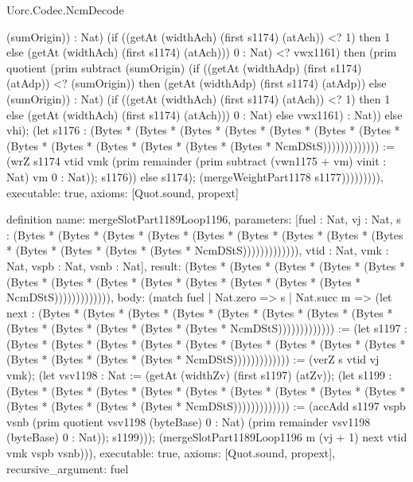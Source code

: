 \begin{lexlean}{Uorc.Codec.NcmDecode}
\begin{semanticmodule}
{(sumOrigin)) : Nat) (if ((getAt (widthAch) (first s1174) (atAch)) <? 1) then 1 else (getAt (widthAch) (first s1174) (atAch))) 0 : Nat) <? vwx1161) then (prim quotient (prim subtract (sumOrigin) (if ((getAt (widthAdp) (first s1174) (atAdp)) <? (sumOrigin)) then (getAt (widthAdp) (first s1174) (atAdp)) else (sumOrigin)) : Nat) (if ((getAt (widthAch) (first s1174) (atAch)) <? 1) then 1 else (getAt (widthAch) (first s1174) (atAch))) 0 : Nat) else vwx1161) : Nat)) else vhi); (let s1176 : (Bytes * (Bytes * (Bytes * (Bytes * (Bytes * (Bytes * (Bytes * (Bytes * (Bytes * (Bytes * (Bytes * (Bytes * (Bytes * NcmDStS))))))))))))) := (wrZ s1174 vtid vmk (prim remainder (prim subtract (vwn1175 + vm) vinit : Nat) vm 0 : Nat)); s1176)) else s1174); (mergeWeightPart1178 s1177))))))))),
  executable: true,
  axioms: [Quot.sound, propext]
}

definition{
  name: mergeSlotPart1189Loop1196,
  parameters: [fuel : Nat, vj : Nat, s : (Bytes * (Bytes * (Bytes * (Bytes * (Bytes * (Bytes * (Bytes * (Bytes * (Bytes * (Bytes * (Bytes * (Bytes * (Bytes * NcmDStS))))))))))))), vtid : Nat, vmk : Nat, vspb : Nat, vsnb : Nat],
  result: (Bytes * (Bytes * (Bytes * (Bytes * (Bytes * (Bytes * (Bytes * (Bytes * (Bytes * (Bytes * (Bytes * (Bytes * (Bytes * NcmDStS))))))))))))),
  body: (match fuel
    | Nat.zero => s
    | Nat.succ m => (let next : (Bytes * (Bytes * (Bytes * (Bytes * (Bytes * (Bytes * (Bytes * (Bytes * (Bytes * (Bytes * (Bytes * (Bytes * (Bytes * NcmDStS))))))))))))) := (let s1197 : (Bytes * (Bytes * (Bytes * (Bytes * (Bytes * (Bytes * (Bytes * (Bytes * (Bytes * (Bytes * (Bytes * (Bytes * (Bytes * NcmDStS))))))))))))) := (verZ s vtid vj vmk); (let vsv1198 : Nat := (getAt (widthZv) (first s1197) (atZv)); (let s1199 : (Bytes * (Bytes * (Bytes * (Bytes * (Bytes * (Bytes * (Bytes * (Bytes * (Bytes * (Bytes * (Bytes * (Bytes * (Bytes * NcmDStS))))))))))))) := (accAdd s1197 vspb vsnb (prim quotient vsv1198 (byteBase) 0 : Nat) (prim remainder vsv1198 (byteBase) 0 : Nat)); s1199))); (mergeSlotPart1189Loop1196 m (vj + 1) next vtid vmk vspb vsnb))),
  executable: true,
  axioms: [Quot.sound, propext],
  recursive_argument: fuel
}


\end{semanticmodule}
\end{lexlean}
